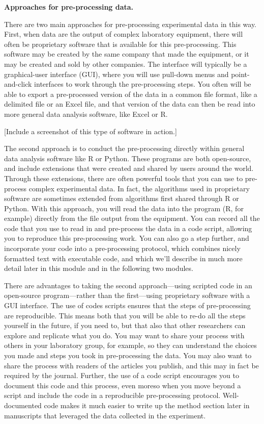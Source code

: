 \documentclass[]{tufte-book}
\begin{document}
\textbf{Approaches for pre-processing data.}

There are two main approaches for pre-processing experimental data in this
way. First, when data are the output of complex laboratory equipment, there
will often be proprietary software that is available for this pre-processing.
This software may be created by the same company that made the equipment, or
it may be created and sold by other companies. The interface will typically
be a graphical-user interface (GUI), where you will use pull-down menus and
point-and-click interfaces to work through the pre-processing steps. You
often will be able to export a pre-processed version of the data in a
common file format, like a delimited file or an Excel file, and that version
of the data can then be read into more general data analysis software, like
Excel or R.

{[}Include a screenshot of this type of software in action.{]}

The second approach is to conduct the pre-processing directly within general
data analysis software like R or Python. These programs are both open-source,
and include extensions that were created and shared by users around the world.
Through these extensions, there are often powerful tools that you can use to
pre-process complex experimental data. In fact, the algorithms used in
proprietary software are sometimes extended from algorithms first shared through
R or Python. With this approach, you will read the data into the program (R,
for example) directly from the file output from the equipment. You can
record all the code that you use to read in and pre-process the data in a
code script, allowing you to reproduce this pre-processing work. You can
also go a step further, and incorporate your code into a pre-processing
protocol, which combines nicely formatted text with executable code, and
which we'll describe in much more detail later in this module and in the
following two modules.

There are advantages to taking the second approach---using scripted code in an
open-source program---rather than the first---using proprietary software with a
GUI interface. The use of codes scripts ensures that the steps of pre-processing
are reproducible. This means both that you will be able to re-do all the steps
yourself in the future, if you need to, but that also that other researchers can
explore and replicate what you do. You may want to share your process with
others in your laboratory group, for example, so they can understand the choices
you made and steps you took in pre-processing the data. You may also want to
share the process with readers of the articles you publish, and this may in fact
be required by the journal. Further, the use of a code script encourages you to
document this code and this process, even moreso when you move beyond a script
and include the code in a reproducible pre-processing protocol. Well-documented
code makes it much easier to write up the method section later in manuscripts
that leveraged the data collected in the experiment.
\end{document}
